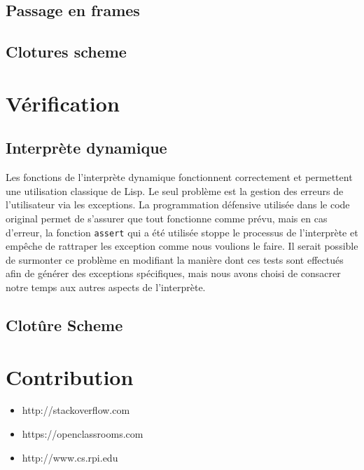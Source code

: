 \documentclass[a4paper,11pt]{article}
\begin{document}
\subsection{Passage en frames}

\subsection{Clotures scheme}

\section{Vérification}
 
 \subsection{Interprète dynamique}
 Les fonctions de l'interprète dynamique fonctionnent correctement et permettent 
 une utilisation classique de Lisp.  
 Le seul problème est la gestion des erreurs de 
 l'utilisateur via les exceptions. La programmation défensive utilisée dans le 
 code original permet de s'assurer que tout fonctionne comme prévu, mais en cas 
 d'erreur, la fonction \texttt{assert} qui a été utilisée stoppe le processus de 
 l'interprète et empêche de rattraper les exception comme nous voulions le faire.
 Il serait possible de surmonter ce problème en modifiant la manière dont ces 
 tests sont effectués afin de générer des exceptions spécifiques, mais nous avons 
 choisi de consacrer notre temps aux autres aspects de l'interprète.
 
 \subsection{Clotûre Scheme}


\section{Contribution}




\begin{itemize}
\item http://stackoverflow.com
\item https://openclassrooms.com
\item http://www.cs.rpi.edu
\end{itemize}
\end{document}

